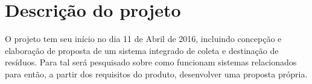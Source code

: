 \section{Descrição do projeto}

  O projeto tem seu início no dia 11 de Abril de 2016, incluindo concepção e elaboração
  de proposta de um sistema integrado de coleta
  e destinação de resíduos. Para tal será pesquisado sobre
  como funcionam sistemas relacionados para então, a partir
  dos requisitos do produto, desenvolver uma proposta própria.
